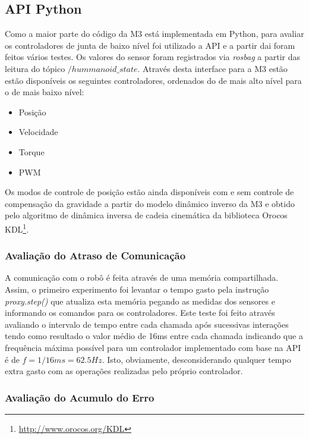 
\subsection{API Python}

Como a maior parte do código da M3 está implementada em Python, para avaliar os controladores de junta de baixo nível foi utilizado a API e a partir dai foram feitos vários testes. Os valores do sensor foram registrados via \textit{rosbag} a partir das leitura do tópico $/hummanoid\_state$. Através desta interface para a M3 estão estão disponíveis os seguintes controladores, ordenados do de mais alto nível para o de mais baixo nível:

\begin{itemize}
    \item Posição
    \item Velocidade
    \item Torque
    \item PWM
\end{itemize}

Os modos de controle de posição estão ainda disponíveis com e sem controle de compensação da gravidade a partir do modelo dinâmico inverso da M3 e obtido pelo algoritmo de dinâmica inversa de cadeia cinemática da biblioteca Orocos KDL\footnote{\url{http://www.orocos.org/KDL}}.

\subsubsection{Avaliação do Atraso de Comunicação}\label{subsec:deadtimepython}

A comunicação com o robô é feita através de uma memória compartilhada. Assim, o primeiro experimento foi levantar o tempo gasto pela instrução \textit{proxy.step()} que atualiza esta memória pegando as medidas dos sensores e informando os comandos para os controladores. Este teste foi feito através avaliando o intervalo de tempo entre cada chamada após sucessivas interações tendo como resultado o valor médio de 16ms entre cada chamada indicando que a frequência máxima possível para um controlador implementado com base na API é de $f = 1/16ms = 62.5Hz$. Isto, obviamente, desconsiderando qualquer tempo extra gasto com as operações realizadas pelo próprio controlador.

\subsubsection{Avaliação do Acumulo do Erro}

